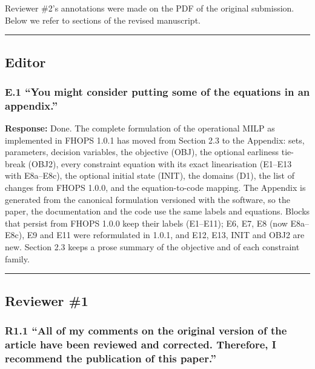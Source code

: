 Reviewer \#2's annotations were made on the PDF of the original
submission. Below we refer to sections of the revised manuscript.

\begin{center}\rule{0.5\linewidth}{0.5pt}\end{center}

\subsection*{Editor}\label{editor}

\subsubsection{E.1 ``You might consider putting some of the equations in
an
appendix.''}\label{e.1-you-might-consider-putting-some-of-the-equations-in-an-appendix.}

\textbf{Response:} Done. The complete formulation of the operational
MILP as implemented in FHOPS 1.0.1 has moved from Section 2.3 to the
Appendix: sets, parameters, decision variables, the objective (OBJ), the
optional earliness tie-break (OBJ2), every constraint equation with its
exact linearisation (E1--E13 with E8a--E8c), the optional initial state
(INIT), the domains (D1), the list of changes from FHOPS 1.0.0, and the
equation-to-code mapping. The Appendix is generated from the canonical
formulation versioned with the software, so the paper, the documentation
and the code use the same labels and equations. Blocks that persist from
FHOPS 1.0.0 keep their labels (E1--E11); E6, E7, E8 (now E8a--E8c), E9
and E11 were reformulated in 1.0.1, and E12, E13, INIT and OBJ2 are new.
Section 2.3 keeps a prose summary of the objective and of each
constraint family.

\begin{center}\rule{0.5\linewidth}{0.5pt}\end{center}

\subsection*{Reviewer \#1}\label{reviewer-1}

\subsubsection{R1.1 ``All of my comments on the original version of the
article have been reviewed and corrected. Therefore, I recommend the
publication of this
paper.''}\label{r1.1-all-of-my-comments-on-the-original-version-of-the-article-have-been-reviewed-and-corrected.-therefore-i-recommend-the-publication-of-this-paper.}

